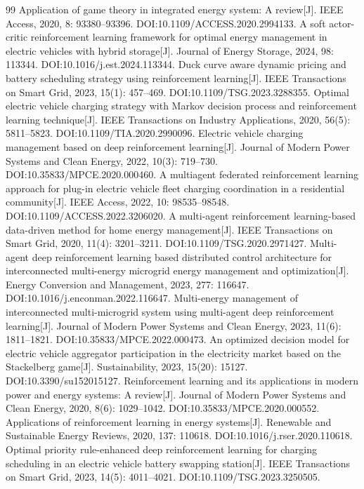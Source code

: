\documentclass[UTF8,a4paper,11pt]{ctexart}
\begin{document}
\begin{thebibliography}{99}
 Application of game theory in integrated energy system: A review[J]. IEEE Access, 2020, 8: 93380--93396. DOI:10.1109/ACCESS.2020.2994133.
 A soft actor-critic reinforcement learning framework for optimal energy management in electric vehicles with hybrid storage[J]. Journal of Energy Storage, 2024, 98: 113344. DOI:10.1016/j.est.2024.113344.
 Duck curve aware dynamic pricing and battery scheduling strategy using reinforcement learning[J]. IEEE Transactions on Smart Grid, 2023, 15(1): 457--469. DOI:10.1109/TSG.2023.3288355.
 Optimal electric vehicle charging strategy with Markov decision process and reinforcement learning technique[J]. IEEE Transactions on Industry Applications, 2020, 56(5): 5811--5823. DOI:10.1109/TIA.2020.2990096.
 Electric vehicle charging management based on deep reinforcement learning[J]. Journal of Modern Power Systems and Clean Energy, 2022, 10(3): 719--730. DOI:10.35833/MPCE.2020.000460.
 A multiagent federated reinforcement learning approach for plug-in electric vehicle fleet charging coordination in a residential community[J]. IEEE Access, 2022, 10: 98535--98548. DOI:10.1109/ACCESS.2022.3206020.
 A multi-agent reinforcement learning-based data-driven method for home energy management[J]. IEEE Transactions on Smart Grid, 2020, 11(4): 3201--3211. DOI:10.1109/TSG.2020.2971427.
 Multi-agent deep reinforcement learning based distributed control architecture for interconnected multi-energy microgrid energy management and optimization[J]. Energy Conversion and Management, 2023, 277: 116647. DOI:10.1016/j.enconman.2022.116647.
 Multi-energy management of interconnected multi-microgrid system using multi-agent deep reinforcement learning[J]. Journal of Modern Power Systems and Clean Energy, 2023, 11(6): 1811--1821. DOI:10.35833/MPCE.2022.000473.
 An optimized decision model for electric vehicle aggregator participation in the electricity market based on the Stackelberg game[J]. Sustainability, 2023, 15(20): 15127. DOI:10.3390/su152015127.
 Reinforcement learning and its applications in modern power and energy systems: A review[J]. Journal of Modern Power Systems and Clean Energy, 2020, 8(6): 1029--1042. DOI:10.35833/MPCE.2020.000552.
 Applications of reinforcement learning in energy systems[J]. Renewable and Sustainable Energy Reviews, 2020, 137: 110618. DOI:10.1016/j.rser.2020.110618.
 Optimal priority rule-enhanced deep reinforcement learning for charging scheduling in an electric vehicle battery swapping station[J]. IEEE Transactions on Smart Grid, 2023, 14(5): 4011--4021. DOI:10.1109/TSG.2023.3250505.

\end{thebibliography}
\end{document}
